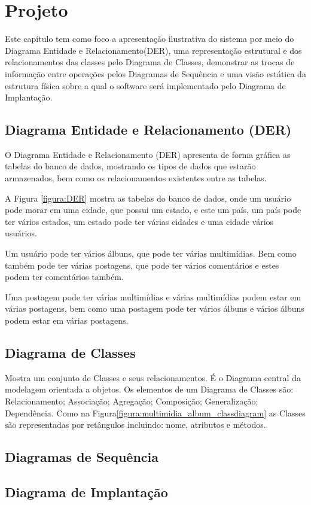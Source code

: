 \chapter{Projeto}

Este capítulo tem como foco a apresentação ilustrativa do sistema por meio do Diagrama Entidade e Relacionamento(DER), uma representação estrutural e dos relacionamentos das classes pelo Diagrama de Classes, demonstrar as trocas de informação entre operações pelos Diagramas de Sequência e uma visão estática da estrutura física sobre a qual o software será implementado pelo Diagrama de Implantação.

\section{Diagrama Entidade e Relacionamento (DER)}

O Diagrama Entidade e Relacionamento (DER) apresenta de forma gráfica as tabelas do banco de dados, mostrando os tipos de dados que estarão armazenados, bem como os relacionamentos existentes entre as tabelas.

A Figura \ref{figura:DER} mostra as tabelas do banco de dados, onde um usuário pode morar em uma cidade, que possui um estado, e este um país, um país pode ter vários estados, um estado pode ter várias cidades e uma cidade vários usuários.

Um usuário pode ter vários álbuns, que pode ter várias multimídias. Bem como também pode ter várias postagens, que pode ter vários comentários e estes podem ter comentários também.

Uma postagem pode ter várias multimídias e várias multimídias podem estar em várias postagens, bem como uma postagem pode ter vários álbuns e vários álbuns podem estar em várias postagens.


\newpage

\section{Diagrama de Classes}

Mostra um conjunto de Classes e seus relacionamentos. É o Diagrama central da
modelagem orientada a objetos. Os elementos de um Diagrama de Classes são:
Relacionamento; Associação; Agregação; Composição; Generalização; Dependência. Como
na Figura\ref{figura:multimidia_album_classdiagram} as Classes são representadas por retângulos incluindo: nome, atributos e
métodos.


\newpage

\section{Diagramas de Sequência}

\section{Diagrama de Implantação}
